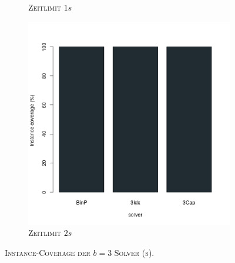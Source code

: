 \begin{figure}[H]
\begin{subfigure}[b]{0.3\textwidth}
\caption{\textsc{Zeitlimit} $1s$}
\label{fig:instance_coverage_b=3_s_b}
\end{subfigure}
\hfill
\begin{subfigure}[b]{0.3\textwidth}
\centering
\includegraphics[width=1.1\textwidth]{img/solver_instance_coverage_b=3_s_2s.png}
\caption{\textsc{Zeitlimit} $2s$}
\label{fig:instance_coverage_b=3_s_c}
\end{subfigure}

\caption{\textsc{Instance-Coverage der $b = 3$ Solver (s)}.}
\label{fig:instance_coverage_b=3_s}
\end{figure}

